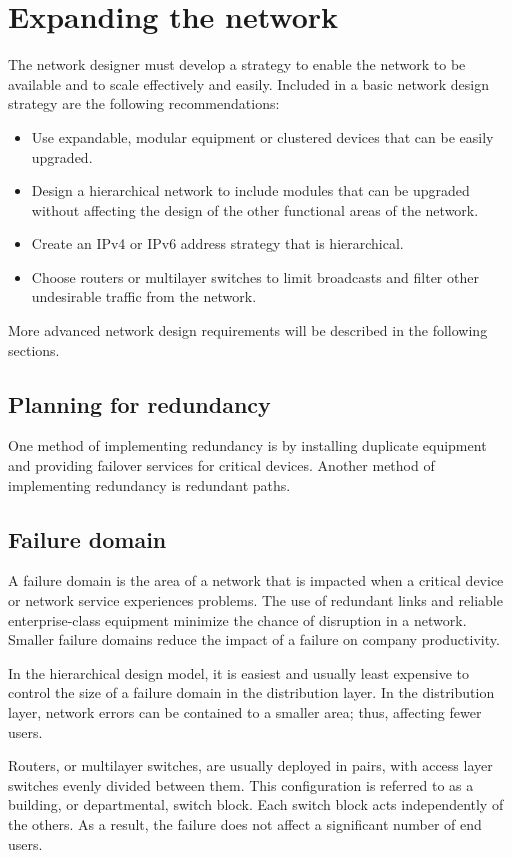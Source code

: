 \section{Expanding the network}
The network designer must develop a strategy to enable the network to be available and to scale effectively and easily. Included in a basic network design strategy are the following recommendations:
\begin{itemize}
\item Use expandable, modular equipment or clustered devices that can be easily upgraded. 
\item Design a hierarchical network to include modules that can be upgraded without affecting the design of the other functional areas of the network.
\item Create an IPv4 or IPv6 address strategy that is hierarchical. 
\item Choose routers or multilayer switches to limit broadcasts and filter other undesirable traffic from the network. 
\end{itemize}
More advanced network design requirements will be described in the following sections.
\subsection{Planning for redundancy}
One method of implementing redundancy is by installing duplicate equipment and providing failover services for critical devices. Another method of implementing redundancy is redundant paths.
\subsection{Failure domain}
A failure domain is the area of a network that is impacted when a critical device or network service experiences problems. The use of redundant links and reliable enterprise-class equipment minimize the chance of disruption in a network. Smaller failure domains reduce the impact of a failure on company productivity.\par 
In the hierarchical design model, it is easiest and usually least expensive to control the size of a failure domain in the distribution layer. In the distribution layer, network errors can be contained to a smaller area; thus, affecting fewer users. \par 
Routers, or multilayer switches, are usually deployed in pairs, with access layer switches evenly divided between them. This configuration is referred to as a building, or departmental, switch block. Each switch block acts independently of the others. As a result, the failure does not affect a significant number of end users.
